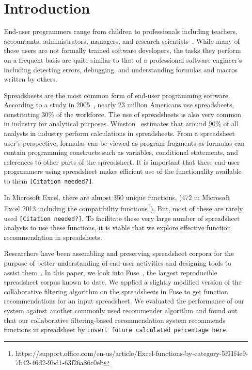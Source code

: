\documentclass[conference]{IEEEtran}
\begin{document}
%
\IEEEpeerreviewmaketitle

\section{Introduction}

End-user programmers range from children to professionals including teachers, accountants, administrators, managers, and research scientists~\cite{ko2011state}. While many of these users are not formally trained software developers, the tasks they perform on a frequent basis are quite similar to that of a professional software engineer's including detecting errors, debugging, and understanding formulas and macros written by others.

Spreadsheets are the most common form of  end-user programming software. According to a study in 2005~\cite{scaffidi2005estimating}, nearly 23 million Americans use spreadsheets, constituting 30\% of the workforce. The use of spreadsheets is also very common in industry for analytical purposes. Winston~\cite{winston2001executive} estimates that around 90\% of all analysts in industry perform calculations in spreadsheets. From a spreadsheet user's perspective, formulas can be viewed as program fragments as formulas can contain programming constructs such as variables, conditional statements, and references to other parts of the spreadsheet. It is important that these end-user programmers using spreadsheet makes efficient use of the functionality available to them \texttt{[Citation needed?]}.

In Microsoft Excel, there are almost 350 unique functions, (472 in Microsoft Excel 2013 including the compatibility functions\footnote{https://support.office.com/en-us/article/Excel-functions-by-category-5f91f4e9-7b42-46d2-9bd1-63f26a86c0eb}). But, most of these are rarely used \texttt{[Citation needed?]}. To facilitate these very large number of spreadsheet analysts to use these functions, it is viable that we explore effective function recommendation in spreadsheets.

Researchers have been assembling and preserving spreadsheet corpora for the purpose of better understanding of end-user activities and designing tools to assist them~\cite{fisher2005euses, hermans2014enron}. In this paper, we look into Fuse~\cite{barik2015fuse}, the largest reproducible spreadsheet corpus known to date. We applied a slightly modified version of the collaborative filtering algorithm on the spreadsheets in Fuse to get function recommendations for an input spreadsheet. We evaluated the performance of our system against another commonly used recommender algorithm and found out that our collaborative filtering-based recommendation system recommends functions in spreadsheet by \texttt{insert future calculated percentage here}. 
\end{document}
